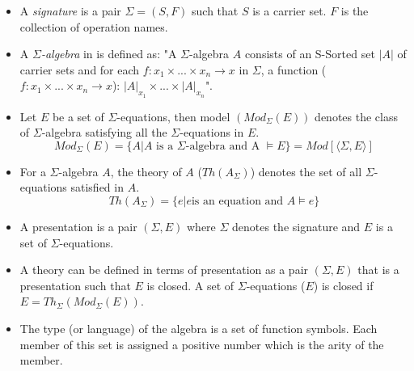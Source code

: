 \begin{itemize}

    \item A \textit{signature} is a pair $\Sigma = (S,F)$ such that $S$ is a
    carrier set. $F$ is the collection of operation names.

    \item A \emph{$\Sigma$-algebra} in \cite{sannella2012foundations} is defined
    as: "A $\Sigma$-algebra $A$ consists of an S-Sorted set $|A|$ of carrier
    sets and for each $f: x_1 \times ... \times x_n \rightarrow x $ in $\Sigma$,
    a function ($f: x_1 \times ... \times x_n \rightarrow x$): $|A|_{x_1} \times
    ... \times |A|_{x_n}$".
 
    \item Let $E$ be a set of $\Sigma$-equations, then model $(Mod_\Sigma(E))$
    denotes the class of $\Sigma$-algebra satisfying all the $\Sigma$-equations
    in $E$.
    \[Mod_\Sigma(E) = \{ A | A \text{ is a } \Sigma\text{-algebra} \text{ and A
    } \models E \} = Mod[⟨\Sigma,E⟩]\]

    \item For a $\Sigma$-algebra $A$, the theory of $A$ ($Th(A_\Sigma)$) denotes
    the set of all $\Sigma$-equations satisfied in $A$. \[Th(A_\Sigma) = \{ e |
    e \text{is an equation and }A \models e \}\]

    \item A presentation is a pair $(\Sigma,E)$ where $\Sigma$ denotes the
    signature and $E$ is a set of $\Sigma$-equations.
    
    \item A theory can be defined in terms of presentation as a pair $(\Sigma,
    E)$ that is a presentation such that $E$ is closed. A set of
    $\Sigma$-equations ($E$) is closed if $E = Th_\Sigma(Mod_\Sigma(E))$.

    \item The type (or language) of the algebra is a set of function symbols.
    Each member of this set is assigned a positive number which is the arity of
    the member.
\end{itemize}

